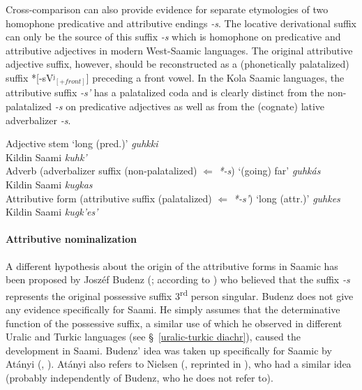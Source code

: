 {Cross-comparison can also provide evidence for separate etymologies of two homophone predicative and attributive endings \textit{-s}. The locative derivational suffix can only be the source of this suffix \textit{-s} which is homophone on predicative and attributive adjectives in modern West-Saamic languages. The original attributive adjective suffix, however, should be reconstructed as a (phonetically palatalized) suffix *[-sVʲ$_{[+front]}$] preceding a front vowel. In the Kola Saamic languages, the attributive suffix \textit{-s'} has a palatalized coda and is clearly distinct from the non-palatalized \textit{-s} on predicative adjectives as well as from the (cognate) lative adverbalizer \textit{-s}.
\begin{exe}
\ex 
\begin{xlist}
\ex	Adjective stem ‘long (pred.)’
 \textit{guhkki}\\
	{Kildin Saami} \textit{kuhk'}\\
\ex 	Adverb (adverbalizer suffix (non-palatalized) $\Leftarrow$ \textit{*-s}) ‘(going) far’
 \textit{guhkás}\\
	{Kildin Saami} \textit{kugkas}\\
\ex 	Attributive form (attributive suffix (palatalized) $\Leftarrow$ \textit{*-s'}) ‘long (attr.)’
 \textit{guhkes}\\
	{Kildin Saami} \textit{kugk'es'}\\
\end{xlist} 	
\end{exe}

\paragraph{Attributive nominalization}
A different hypothesis about the origin of the attributive forms in Saamic has been proposed by Joszéf Budenz (\citeyear{budenz1870}; according to \citealt{atanyi1942,atanyi1943}) who believed that the suffix \textit{-s} represents the original possessive suffix 3\textsuperscript{rd} person singular. Budenz does not give any evidence specifically for Saami. He simply assumes that the determinative function of the possessive suffix, a similar use of which he observed in different Uralic and Turkic languages (see \S~\ref{uralic-turkic diachr}), caused the development in Saami. Budenz' idea was taken up specifically for Saamic by Atányi (\citeyear{atanyi1942}, \citeyear{atanyi1943}). Atányi also refers to Nielsen (\citeyear{nielsen1933}, reprinted in \citealt{nielsen1945b}), who had a similar idea (probably independently of Budenz, who he does not refer to).

}

